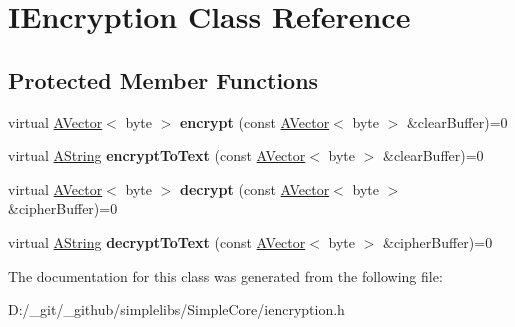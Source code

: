 \hypertarget{class_i_encryption}{}\section{I\+Encryption Class Reference}
\label{class_i_encryption}
\subsection*{Protected Member Functions}
\begin{DoxyCompactItemize}
\item 
\mbox{\label{class_i_encryption_aa888b4e42172490054708fb099626458}} 
virtual \mbox{\hyperlink{class_a_vector}{A\+Vector}}$<$ byte $>$ {\bfseries encrypt} (const \mbox{\hyperlink{class_a_vector}{A\+Vector}}$<$ byte $>$ \&clear\+Buffer)=0
\item 
\mbox{\label{class_i_encryption_aef8211993831f83e031e7f1e9f978a4d}} 
virtual \mbox{\hyperlink{class_a_string}{A\+String}} {\bfseries encrypt\+To\+Text} (const \mbox{\hyperlink{class_a_vector}{A\+Vector}}$<$ byte $>$ \&clear\+Buffer)=0
\item 
\mbox{\label{class_i_encryption_a07250dc1d1f1cd6de54df34e079f749d}} 
virtual \mbox{\hyperlink{class_a_vector}{A\+Vector}}$<$ byte $>$ {\bfseries decrypt} (const \mbox{\hyperlink{class_a_vector}{A\+Vector}}$<$ byte $>$ \&cipher\+Buffer)=0
\item 
\mbox{\label{class_i_encryption_ad1dafdacb077abfd40a995ae22ef0396}} 
virtual \mbox{\hyperlink{class_a_string}{A\+String}} {\bfseries decrypt\+To\+Text} (const \mbox{\hyperlink{class_a_vector}{A\+Vector}}$<$ byte $>$ \&cipher\+Buffer)=0
\end{DoxyCompactItemize}


The documentation for this class was generated from the following file\+:\begin{DoxyCompactItemize}
\item 
D\+:/\+\_\+git/\+\_\+github/simplelibs/\+Simple\+Core/iencryption.\+h\end{DoxyCompactItemize}

